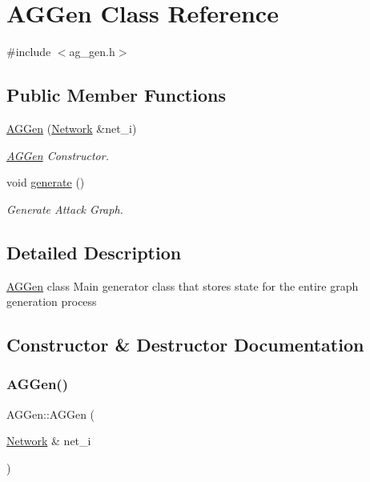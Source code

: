 \hypertarget{class_a_g_gen}{}\section{A\+G\+Gen Class Reference}
\label{class_a_g_gen}


{\ttfamily \#include $<$ag\+\_\+gen.\+h$>$}

\subsection*{Public Member Functions}
\begin{DoxyCompactItemize}
\item 
\mbox{\hyperlink{class_a_g_gen_aa7d90a88f555644912a5bc11fc54a029}{A\+G\+Gen}} (\mbox{\hyperlink{class_network}{Network}} \&net\+\_\+i)
\begin{DoxyCompactList}\small\item\em \mbox{\hyperlink{class_a_g_gen}{A\+G\+Gen}} Constructor. \end{DoxyCompactList}\item 
void \mbox{\hyperlink{class_a_g_gen_a0c95ee4d204aa3cc985570f9cf592c14}{generate}} ()
\begin{DoxyCompactList}\small\item\em Generate Attack Graph. \end{DoxyCompactList}\end{DoxyCompactItemize}


\subsection{Detailed Description}
\mbox{\hyperlink{class_a_g_gen}{A\+G\+Gen}} class Main generator class that stores state for the entire graph generation process 

\subsection{Constructor \& Destructor Documentation}
\mbox{\label{class_a_g_gen_aa7d90a88f555644912a5bc11fc54a029}} 
\subsubsection{\texorpdfstring{A\+G\+Gen()}{AGGen()}}
{\footnotesize\ttfamily A\+G\+Gen\+::\+A\+G\+Gen (\begin{DoxyParamCaption}\item[{\mbox{\hyperlink{class_network}{Network}} \&}]{net\+\_\+i }\end{DoxyParamCaption})\hspace{0.3cm}{\ttfamily [explicit]}}



